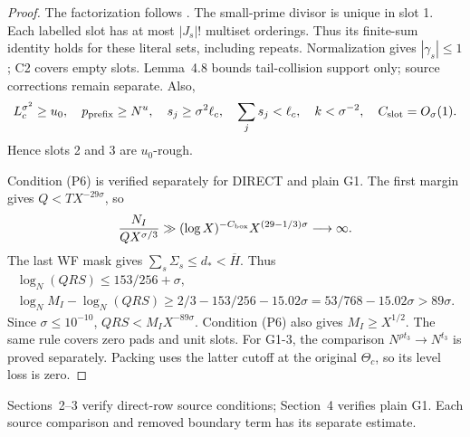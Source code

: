 \begin{proof}
The factorization follows \cite[Lemma~4.8, (4.12)--(4.13)]{Z1}.
The small-prime divisor is unique in slot 1.
Each labelled slot has at most $|J_s|!$ multiset orderings.
Thus its finite-sum identity holds for these literal sets, including repeats.
Normalization gives $|\gamma_s|\le1$; C2 covers empty slots.
Lemma~4.8 bounds tail-collision support only; source corrections remain separate.
Also,
\[
 L_c^{\sigma^2}\ge u_0,\quad p_{\rm prefix}\ge N^u,\quad
 s_j\ge\sigma^2\ell_c,\quad\sum_js_j<\ell_c,\quad
 k<\sigma^{-2},\quad C_{\rm slot}=O_\sigma(1).
\]
Hence slots 2 and 3 are $u_0$-rough.

Condition (P6) is verified separately for DIRECT and plain G1.
The first margin gives $Q<TX^{-29\sigma}$, so
\[
 {N_I\over QX^{\sigma/3}}\gg
 (\log X)^{-C_{\rm box}}X^{(29-1/3)\sigma}\longrightarrow\infty.
\]
The last WF mask gives $\sum_s\Sigma_s\le d_*<\overline H$.
Thus
\[
\begin{gathered}
 \log_N(QRS)\le153/256+\sigma,\\
 \log_NM_I-\log_N(QRS)\ge
 2/3-153/256-15.02\sigma=53/768-15.02\sigma>89\sigma.
\end{gathered}
\]
Since $\sigma\le10^{-10}$, $QRS<M_I X^{-89\sigma}$.
Condition (P6) also gives $M_I\ge X^{1/2}$.
The same rule covers zero pads and unit slots.
For G1-3, the comparison $N^{\rho t_3}\to N^{t_3}$ is proved separately.
Packing uses the latter cutoff at the original $\Theta_c$,
so its level loss is zero.
\end{proof}

Sections~2--3 verify direct-row source conditions; Section~4 verifies plain G1.
Each source comparison and removed boundary term has its separate estimate.
